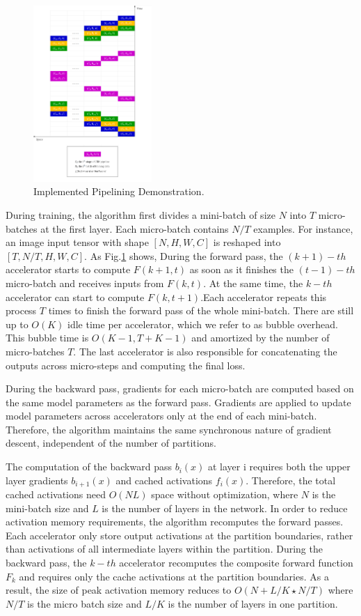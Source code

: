 \documentclass[conference]{IEEEtran}
\begin{document}
\begin{figure}[htbp]
\centerline{\includegraphics[width = 0.4\textwidth]{pipeline_status.png}}
\caption{Implemented Pipelining Demonstration.}
\label{fig1}
\end{figure}

During training, the algorithm first divides a mini-batch of size $N$ into $T$ micro-batches at the first layer. Each micro-batch contains $N/T$ examples. For instance, an image input tensor with shape $[N, H, W, C]$ is reshaped into $[T, N/T, H, W, C]$. As Fig.\ref{fig1} shows, During the forward pass, the $(k+1)-th$ accelerator starts to compute $F(k+1,t)$ as soon as it finishes the $(t−1)-th$ micro-batch and receives inputs from $F(k,t)$. At the same time, the $k-th$ accelerator can start to compute $F(k,t+1)$.Each accelerator repeats this process $T$ times to finish the forward pass of the whole mini-batch. There are still up to $O(K)$ idle time per accelerator, which we refer to as bubble overhead. This bubble time is $O(K−1, T+K−1)$ and amortized by the number of micro-batches $T$. The last accelerator is also responsible for concatenating the outputs across micro-steps and computing the final loss.

During the backward pass, gradients for each micro-batch are computed based on the same model parameters as the forward pass. Gradients are applied to update model parameters across accelerators only at the end of each mini-batch. Therefore, the algorithm maintains the same synchronous nature of gradient descent, independent of the number of partitions. 

The computation of the backward pass $b_i(x)$ at layer i requires both the upper layer gradients $b_{i+1}(x)$ and cached activations $f_i(x)$. Therefore, the total cached activations need $O(NL)$ space without optimization, where $N$ is the mini-batch size and $L$ is the number of layers in the network. In order to reduce activation memory requirements, the algorithm recomputes the forward passes. Each accelerator only store output activations at the partition boundaries, rather than activations of all intermediate layers within the partition. During the backward pass, the $k-th$ accelerator recomputes the composite forward function $F_k$ and requires only the cache activations at the partition boundaries. As a result, the size of peak activation memory reduces to $O(N +L/K\star N/T)$ where $N/T$ is the micro batch size and $L/K$ is the number of layers in one partition.
\end{document}
